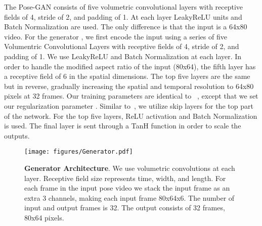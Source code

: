  The Pose-GAN consists of five volumetric convolutional layers with receptive fields of 4, stride of 2, and padding of 1. At each layer LeakyReLU units and Batch Normalization are used. The only difference is that the input is a 64x80 video. For the generator , we first encode the input using a series of five Volumentric Convolutional Layers with receptive fields of 4, stride of 2, and padding of 1. We use LeakyReLU and Batch Normalization at each layer. In order to handle the modified aspect ratio of the input (80x64), the fifth layer has a receptive field of 6 in the spatial dimensions. The top five layers are the same but in reverse, gradually increasing the spatial and temporal resolution to 64x80 pixels at 32 frames. Our training parameters are identical to ~\cite{Vondrick16}, except that we set our regularization parameter . Similar to~\cite{Isola16}, we utilize skip layers for the top part of the network. For the top five layers, ReLU activation and Batch Normalization is used. The final layer is sent through a TanH function in order to scale the outputs. 

\begin{figure}
\centering
\texttt{[image: figures/Generator.pdf]} 
\vspace{-0.2in}
\caption{{\bf Generator Architecture}. We use volumetric convolutions at each layer. Receptive field size represents time, width, and length. For each frame in the input pose video we stack the input frame as an extra 3 channels, making each input frame 80x64x6. The number of input and output frames is 32. The output consists of 32 frames, 80x64 pixels.}
\vspace{-0.2in}
\label{fig:GANArchitecture}
\end{figure}
